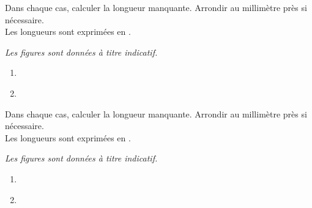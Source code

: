 \begin{exercice*}
    Dans chaque cas, calculer la longueur manquante. Arrondir au millimètre près si nécessaire.\\
    Les longueurs sont exprimées en \Lg{}.

    {\it Les figures sont données à titre indicatif.}
    \begin{multicols}{2}
        \begin{enumerate}
            \item \phantom{rrr}\\
            
            \item \phantom{rrr}\\
            
        \end{enumerate}
    \end{multicols}
\end{exercice*}
\begin{corrige}
    Dans chaque cas, calculer la longueur manquante. Arrondir au millimètre près si nécessaire.\\
    Les longueurs sont exprimées en \Lg{}.

    {\it Les figures sont données à titre indicatif.}

    \begin{enumerate}
        \item \phantom{rrr}\\
        
        {\red {}}
        \item \phantom{rrr}\\
        
        {\red {}}
    \end{enumerate}

\end{corrige}

